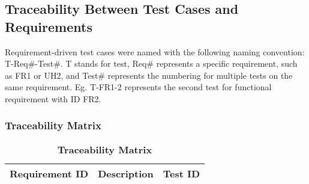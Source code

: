 \documentclass[12pt, titlepage]{article}
\begin{document}
\subsection{Traceability Between Test Cases and Requirements}

Requirement-driven test cases were named with the following naming convention: T-Req\#-Test\#. T stands for test, Req\# represents a specific requirement, such as FR1 or UH2, and Test\# represents the numbering for multiple tests on the same requirement. Eg. T-FR1-2 represents the second test for functional requirement with ID FR2.

\subsubsection{Traceability Matrix}
\begin{center}
    \begin{longtable}{ |c|c|c| } 
        \caption{\textbf{Traceability Matrix}} \label{tab:long}\\
        \hline
        \multicolumn{1}{|c|}{\textbf{Requirement ID}} & \multicolumn{1}{c|}{\textbf{Description}} & \multicolumn{1}{c|}{\textbf{Test ID}} \\ \hline 
        \endfirsthead
        

\end{longtable}
\end{center}
\end{document}
